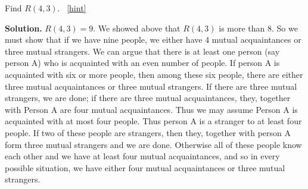 \documentclass{book}
\begin{document}
\setcounter{project}{51}
\addtocounter{project}{-1}
\begin{activity}[]\label{activity-44}
\hypertarget{p-443}{}%
Find \(R(4,3)\).%
~\hfill{\tiny\hyperlink{a-51}{[hint]}\hypertarget{q-51}{}}\par\smallskip%
\noindent\textbf{Solution.}\hypertarget{solution-48}{}\quad%
\hypertarget{p-445}{}%
\(R(4,3)=9\). We showed above that \(R(4,3)\) is more than 8. So we must show that if we have nine people, we either have 4 mutual acquaintances or three mutual strangers. We can argue that there is at least one person (say person A) who is acquainted with an even number of people. If person A is acquainted with six or more people, then among these six people, there are either three mutual acquaintances or three mutual strangers. If there are three mutual strangers, we are done; if there are three mutual acquaintances, they, together with Person A are four mutual acquaintances. Thus we may assume Person A is acquainted with at most four people. Thus person A is a stranger to at least four people. If two of these people are strangers, then they, together with person A form three mutual strangers and we are done. Otherwise all of these people know each other and we have at least four mutual acquaintances, and so in every possible situation, we have either four mutual acquaintances or three mutual strangers.%
\end{activity}
\end{document}
